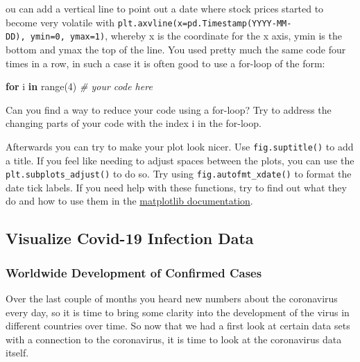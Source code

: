 \documentclass[
  11pt,
]{article}
\newenvironment{Shaded}{\begin{snugshade}}{\end{snugshade}}
\newcommand{\BuiltInTok}[1]{#1}
\newcommand{\CommentTok}[1]{\textcolor[rgb]{0.56,0.35,0.01}{\textit{#1}}}
\newcommand{\ControlFlowTok}[1]{\textcolor[rgb]{0.13,0.29,0.53}{\textbf{#1}}}
\newcommand{\DecValTok}[1]{\textcolor[rgb]{0.00,0.00,0.81}{#1}}
\newcommand{\KeywordTok}[1]{\textcolor[rgb]{0.13,0.29,0.53}{\textbf{#1}}}
\newcommand{\NormalTok}[1]{#1}
\newenvironment{tipsp}[1]
  {
  \begin{itemize}
  \footnotesize
  \renewcommand{\labelitemi}{
    \raisebox{-.7\height}[0pt][0pt]{
      {\setkeys{Gin}{width=3em,keepaspectratio}
        \texttt{[image: images/\#1.png]}}
    }
  }
  \setlength{\fboxsep}{1em}
  \begin{pbox}
  \item
  }
  {
  \end{pbox}
  \end{itemize}
  }
\begin{document}
\begin{tipsp}
You can add a vertical line to point out a date where stock prices started to become very volatile with \texttt{plt.axvline(x=pd.Timestamp(\textquotesingle{}YYYY-MM-DD\textquotesingle{}),\ ymin=0,\ ymax=1)}, whereby x is the coordinate for the x axis, ymin is the bottom and ymax the top of the line.
You used pretty much the same code four times in a row, in such a case it is often good to use a for-loop of the form:

\begin{Shaded}
\begin{Highlighting}[]
\ControlFlowTok{for}\NormalTok{ i }\KeywordTok{in} \BuiltInTok{range}\NormalTok{(}\DecValTok{4}\NormalTok{)}
    \CommentTok{\# your code here}
\end{Highlighting}
\end{Shaded}

Can you find a way to reduce your code using a for-loop? Try to address the changing parts of your code with the index i in the for-loop.

Afterwards you can try to make your plot look nicer.
Use \texttt{fig.suptitle()} to add a title.
If you feel like needing to adjust spaces between the plots, you can use the \texttt{plt.subplots\_adjust()} to do so.
Try using \texttt{fig.autofmt\_xdate()} to format the date tick labels. If you need help with these functions, try to find out what they do and how to use them in the \href{https://matplotlib.org/3.2.1/contents.html}{matplotlib documentation}.

\end{tipsp}

\hypertarget{visualize-covid-19-infection-data}{%
\subsection{Visualize Covid-19 Infection Data}\label{visualize-covid-19-infection-data}}

\hypertarget{worldwide-development-of-confirmed-cases}{%
\subsubsection{Worldwide Development of Confirmed Cases}\label{worldwide-development-of-confirmed-cases}}

Over the last couple of months you heard new numbers about the coronavirus every day, so it is time to bring some clarity into the development of the virus in different countries over time. So now that we had a first look at certain data sets with a connection to the coronavirus, it is time to look at the coronavirus data itself.
\end{document}
